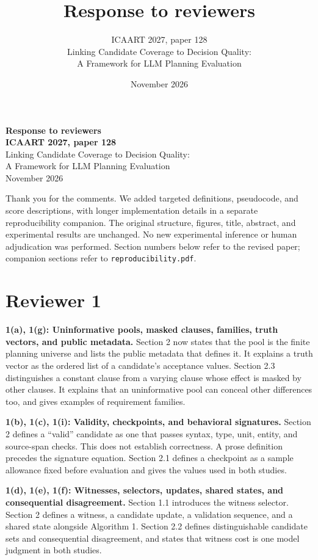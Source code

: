 \documentclass[11pt,a4paper]{scrartcl}
\title{Response to reviewers}
\subtitle{ICAART 2027, paper 128\\Linking Candidate Coverage to Decision Quality:\\A Framework for LLM Planning Evaluation}
\author{}
\date{November 2026}
\begin{document}
\begin{center}
{\Large\sffamily\bfseries Response to reviewers}\\[0.5em]
{\bfseries ICAART 2027, paper 128}\\
Linking Candidate Coverage to Decision Quality:\\
A Framework for LLM Planning Evaluation\\[0.4em]
November 2026
\end{center}

Thank you for the comments. We added targeted definitions, pseudocode, and score descriptions, with longer implementation details in a separate reproducibility companion. The original structure, figures, title, abstract, and experimental results are unchanged. No new experimental inference or human adjudication was performed. Section numbers below refer to the revised paper; companion sections refer to \texttt{reproducibility.pdf}.

\section*{Reviewer 1}

\textbf{1(a), 1(g): Uninformative pools, masked clauses, families, truth vectors, and public metadata.}
Section 2 now states that the pool is the finite planning universe and lists the public metadata that defines it. It explains a truth vector as the ordered list of a candidate's acceptance values. Section 2.3 distinguishes a constant clause from a varying clause whose effect is masked by other clauses. It explains that an uninformative pool can conceal other differences too, and gives examples of requirement families.

\textbf{1(b), 1(c), 1(i): Validity, checkpoints, and behavioral signatures.}
Section 2 defines a ``valid'' candidate as one that passes syntax, type, unit, entity, and source-span checks. This does not establish correctness. A prose definition precedes the signature equation. Section 2.1 defines a checkpoint as a sample allowance fixed before evaluation and gives the values used in both studies.

\textbf{1(d), 1(e), 1(f): Witnesses, selectors, updates, shared states, and consequential disagreement.}
Section 1.1 introduces the witness selector. Section 2 defines a witness, a candidate update, a validation sequence, and a shared state alongside Algorithm 1. Section 2.2 defines distinguishable candidate sets and consequential disagreement, and states that witness cost is one model judgment in both studies.
\end{document}
